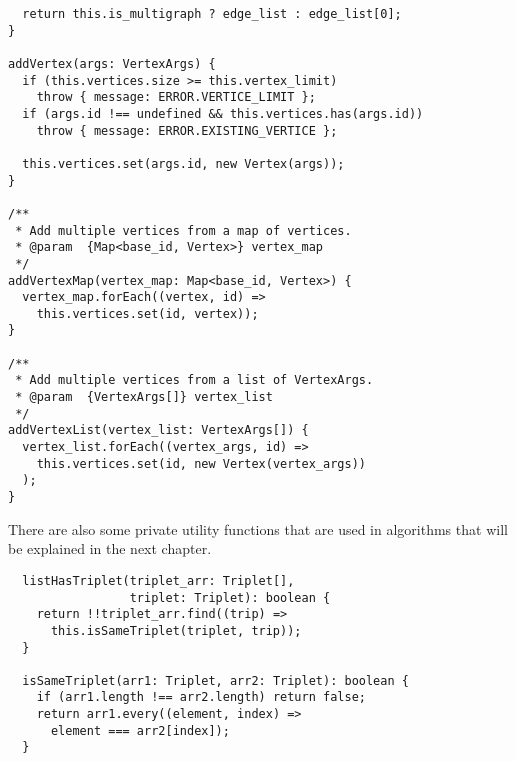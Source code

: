 \begin{verbatim}
  return this.is_multigraph ? edge_list : edge_list[0];
}

addVertex(args: VertexArgs) {
  if (this.vertices.size >= this.vertex_limit)
    throw { message: ERROR.VERTICE_LIMIT };
  if (args.id !== undefined && this.vertices.has(args.id))
    throw { message: ERROR.EXISTING_VERTICE };

  this.vertices.set(args.id, new Vertex(args));
}

/**
 * Add multiple vertices from a map of vertices.
 * @param  {Map<base_id, Vertex>} vertex_map
 */
addVertexMap(vertex_map: Map<base_id, Vertex>) {
  vertex_map.forEach((vertex, id) =>
    this.vertices.set(id, vertex));
}

/**
 * Add multiple vertices from a list of VertexArgs.
 * @param  {VertexArgs[]} vertex_list
 */
addVertexList(vertex_list: VertexArgs[]) {
  vertex_list.forEach((vertex_args, id) =>
    this.vertices.set(id, new Vertex(vertex_args))
  );
}
\end{verbatim}

There are also some private utility functions that are used in algorithms
that will be explained in the next chapter.

\begin{verbatim}
  listHasTriplet(triplet_arr: Triplet[],
                 triplet: Triplet): boolean {
    return !!triplet_arr.find((trip) =>
      this.isSameTriplet(triplet, trip));
  }

  isSameTriplet(arr1: Triplet, arr2: Triplet): boolean {
    if (arr1.length !== arr2.length) return false;
    return arr1.every((element, index) =>
      element === arr2[index]);
  }
\end{verbatim}